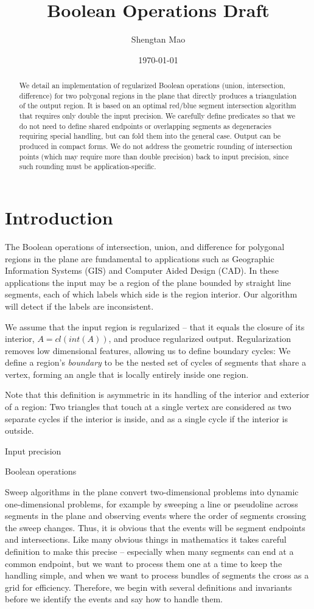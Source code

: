 \documentclass[11pt]{article}
\title{Boolean Operations Draft}
\author{Shengtan Mao}
\date{\today}
\begin{document}
\maketitle
\begin{abstract}
We detail an implementation of regularized Boolean operations (union, intersection, difference) for two polygonal regions in the plane that directly produces a triangulation of the output region. 
It is based on an optimal red/blue segment intersection algorithm that requires only double the input precision.  
We carefully define predicates so that we do not need to define shared endpoints or overlapping segments as degeneracies requiring special handling, but can fold them into the general case.  
Output can be produced in compact forms.  
We do not address the geometric rounding of  intersection points (which may require more than double precision) back to input precision, since such rounding must be application-specific.
\end{abstract}
\section{Introduction}

The Boolean operations of intersection, union, and difference for polygonal regions in the plane are fundamental to applications such as Geographic Information Systems (GIS)
and Computer Aided Design (CAD).  
In these applications the input may be a region of the plane bounded by straight line segments, 
each of which labels which side is the region interior.  
Our algorithm will detect if the labels are inconsistent.

We assume that the input region is regularized -- that it equals the closure of its interior, 
$A= \textit{cl}(\textit{int}(A))$, and produce regularized output. 
Regularization removes low dimensional features, allowing us to define boundary cycles: 
We define a region's \textit{boundary} to be the nested set of cycles of segments that share a vertex, forming an angle that is locally entirely inside one region. 

Note that this definition is asymmetric in its handling of the interior and exterior of a region:  Two triangles that touch at a single vertex are considered as two separate cycles if the interior is inside, and as a single cycle if the interior is outside.  

Input precision

Boolean operations

Sweep algorithms in the plane convert two-dimensional problems into dynamic one-dimensional problems,
for example by sweeping a line or pseudoline across segments in the
plane and observing events where the order of segments crossing the sweep changes.
Thus, it is obvious that the events will be segment endpoints and intersections. Like many obvious things in mathematics it takes careful definition to make this precise -- especially when many segments can end at a common endpoint, but we want to process them one at a time to keep the handling simple, and when we want to process bundles of segments the cross as a grid for efficiency.  
Therefore, we begin with several definitions and invariants before we identify the events and say how to handle them. 
\end{document}
